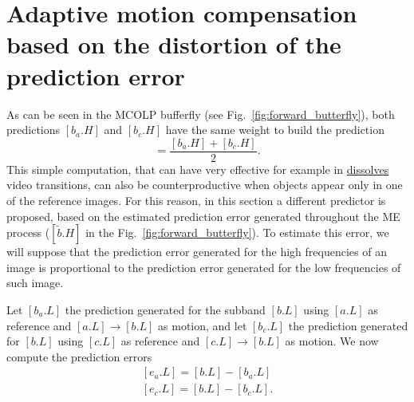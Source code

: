 


\section{Adaptive motion compensation based on the distortion of the prediction error}

As can be seen in the MCOLP bufferfly (see
Fig.~\ref{fig:forward_butterfly}), both predictions $[b_a.H]$ and
$[b_c.H]$ have the same weight to build the prediction
\begin{equation}
  [\hat{b.H}] = \frac{[b_a.H] + [b_c.H]}{2}.
\end{equation}
This simple computation, that can have very effective for example in
\href{https://biteable.com/blog/tips/video-transitions-effects-examples/}{dissolves}
video transitions, can also be counterproductive when objects appear
only in one of the reference images. For this reason, in this section
a different predictor is proposed, based on the estimated prediction
error generated throughout the ME process ($[\tilde{b}.H]$ in the
Fig.~\ref{fig:forward_butterfly}). To estimate this error, we will
suppose that the prediction error generated for the high frequencies
of an image is proportional to the prediction error generated for the
low frequencies of such image.

Let $[b_a.L]$ the prediction generated for the subband $[b.L]$ using
$[a.L]$ as reference and $[a.L]\rightarrow [b.L]$ as motion, and let
$[b_c.L]$ the prediction generated for $[b.L]$ using $[c.L]$ as
reference and $[c.L]\rightarrow [b.L]$ as motion. We now compute the
prediction errors
\begin{equation}
  \begin{array}{l}
    {[e_a.L]} = [b.L] - [b_a.L]\\
    {[e_c.L]} = [b.L] - [b_c.L].
  \end{array}
\end{equation}

